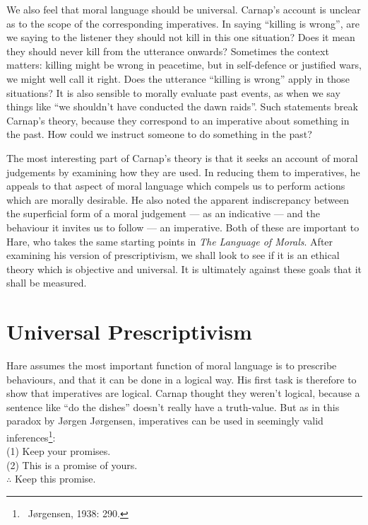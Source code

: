 \documentclass[12pt]{article}
\begin{document}
We also feel that moral language should be universal. Carnap's account is unclear as to the scope of the corresponding imperatives. In saying ``killing is wrong'', are we saying to the listener they should not kill in this one situation? Does it mean they should never kill from the utterance onwards? Sometimes the context matters: killing might be wrong in peacetime, but in self-defence or justified wars, we might well call it right. Does the utterance ``killing is wrong'' apply in those situations? It is also sensible to morally evaluate past events, as when we say things like ``we shouldn't have conducted the dawn raids''. Such statements break Carnap's theory, because they correspond to an imperative about something in the past. How could we instruct someone to do something in the past?

The most interesting part of Carnap's theory is that it seeks an account of moral judgements by examining how they are used. In reducing them to imperatives, he appeals to that aspect of moral language which compels us to perform actions which are morally desirable. He also noted the apparent indiscrepancy between the superficial form of a moral judgement --- as an indicative --- and the behaviour it invites us to follow --- an imperative. Both of these are important to Hare, who takes the same starting points in \textit{The Language of Morals}. After examining his version of prescriptivism, we shall look to see if it is an ethical theory which is objective and universal. It is ultimately against these goals that it shall be measured.\\

\section{Universal Prescriptivism}

Hare assumes the most important function of moral language is to prescribe behaviours, and that it can be done in a logical way. His first task is therefore to show that imperatives are logical. Carnap thought they weren't logical, because a sentence like ``do the dishes'' doesn't really have a truth-value. But as in this paradox by Jørgen Jørgensen, imperatives can be used in seemingly valid inferences\footnote{~Jørgensen, 1938: 290.}:\\

(1) Keep your promises.\\
\indent
(2) This is a promise of yours.\\
\indent
$\therefore$ Keep this promise.\\
\end{document}
